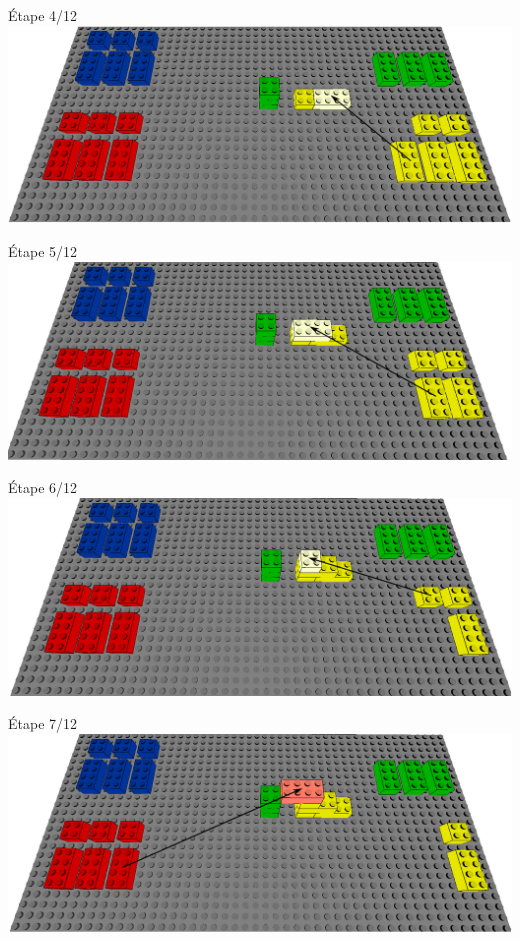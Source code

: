 \documentclass[aspectratio=169]{beamer}
\begin{document}
\begin{frame}
    Étape 4/12
    \vfill
  \includegraphics[width=\linewidth]{step4.png}
\end{frame}

\begin{frame}
    Étape 5/12
    \vfill
  \includegraphics[width=\linewidth]{step5.png}
\end{frame}

\begin{frame}
    Étape 6/12
    \vfill
  \includegraphics[width=\linewidth]{step6.png}
\end{frame}

\begin{frame}
    Étape 7/12
    \vfill
  \includegraphics[width=\linewidth]{step7.png}
\end{frame}
\end{document}
